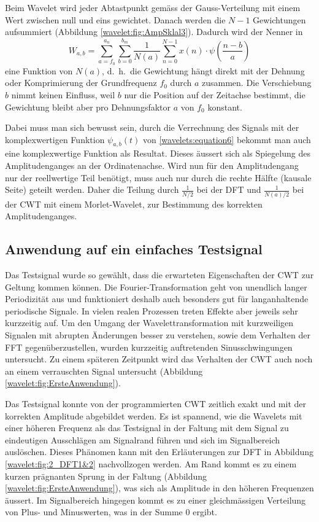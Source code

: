 Beim Wavelet wird jeder Abtastpunkt gemäss der Gauss-Verteilung mit
einem Wert zwischen null und eins gewichtet.
Danach werden die $N-1$ Gewichtungen aufsummiert (Abbildung
\ref{wavelet:fig:AmpSklal3}).
Dadurch wird der Nenner in
\[W_{a,b}=\sum_{a=f_0}^{a_n}\sum_{b=0}^{b_m}\frac{1}{N(a)}\sum_{n=0}^{N-1}
x(n)\cdot\psi\left(\frac{n-b}{a}\right)\] eine Funktion von $N(a)$,
d.~h.~die Gewichtung hängt direkt mit der Dehnung oder Komprimierung
der Grundfrequenz $f_0$ durch $a$ zusammen.
Die Verschiebung $b$ nimmt keinen Einfluss, weil $b$ nur die Position
auf der Zeitachse bestimmt, die Gewichtung bleibt aber pro
Dehnungsfaktor $a$ von $f_0$ konstant.

Dabei muss man sich bewusst sein, durch die Verrechnung des Signals
mit der komplexwertigen Funktion \(\psi_{a,b}(t)\) von
\eqref{wavelets:equation6} bekommt man auch eine komplexwertige
Funktion als Resultat.
Dieses äussert sich als Spiegelung des Amplitudenganges an der
Ordinatenachse.
Wird nun für den Amplitudengang nur der reellwertige Teil benötigt,
muss auch nur durch die rechte Hälfte (kausale Seite) geteilt werden.
Daher die Teilung durch $\frac{1}{N/2}$ bei der DFT und
\(\frac{1}{N(a)/2}\) bei der CWT mit einem Morlet-Wavelet, zur
Bestimmung des korrekten Amplitudenganges.

\subsection{Anwendung auf ein einfaches Testsignal
	\label{wavelets:subsection:ErsteAnwendung}}
Das Testsignal wurde so gewählt, dass die erwarteten Eigenschaften
der CWT zur Geltung kommen können.
Die Fourier-Transformation geht von unendlich langer Periodizität
aus und funktioniert deshalb auch besonders gut für langanhaltende
periodische Signale.
In vielen realen Prozessen treten Effekte aber jeweils sehr kurzzeitig auf.
Um den Umgang der Wavelettransformation mit kurzweiligen Signalen
mit abrupten Änderungen besser zu verstehen, sowie dem Verhalten der
FFT gegenüberzustellen, wurden kurzzeitig auftretenden Sinusschwingungen
untersucht.
Zu einem späteren Zeitpunkt wird das Verhalten der CWT auch noch
an einem verrauschten Signal untersucht (Abbildung
\ref{wavelet:fig:ErsteAnwendung}).

Das Testsignal konnte von der programmierten CWT zeitlich exakt und
mit der korrekten Amplitude abgebildet werden.
Es ist spannend, wie die Wavelets mit einer höheren Frequenz als
das Testsignal in der Faltung mit dem Signal zu eindeutigen Ausschlägen
am Signalrand führen und sich im Signalbereich auslöschen.
Dieses Phänomen kann mit den Erläuterungen zur DFT in Abbildung
\ref{wavelet:fig:2_DFT1&2} nachvollzogen werden.
Am Rand kommt es zu einem kurzen prägnanten Sprung in der Faltung
(Abbildung \ref{wavelet:fig:ErsteAnwendung}), was sich als Amplitude
in den höheren Frequenzen äussert.
Im Signalbereich hingegen kommt es zu einer gleichmässigen Verteilung
von Plus- und Minuswerten, was in der Summe $0$ ergibt.

